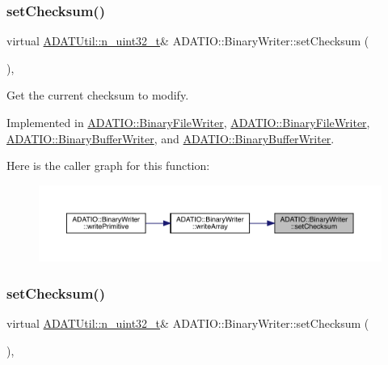 \subsubsection{\texorpdfstring{setChecksum()}{setChecksum()}\hspace{0.1cm}{\footnotesize\ttfamily [1/2]}}
{\footnotesize\ttfamily virtual \mbox{\hyperlink{namespaceADATUtil_ad945a8afa4db2d1f89b731964adae97e}{A\+D\+A\+T\+Util\+::n\+\_\+uint32\+\_\+t}}\& A\+D\+A\+T\+I\+O\+::\+Binary\+Writer\+::set\+Checksum (\begin{DoxyParamCaption}{ }\end{DoxyParamCaption})\hspace{0.3cm}{\ttfamily [protected]}, {}}



Get the current checksum to modify. 



Implemented in \mbox{\hyperlink{classADATIO_1_1BinaryFileWriter_a0137ec5926d08e49ed7a63c6ef33e882}{A\+D\+A\+T\+I\+O\+::\+Binary\+File\+Writer}}, \mbox{\hyperlink{classADATIO_1_1BinaryFileWriter_a0137ec5926d08e49ed7a63c6ef33e882}{A\+D\+A\+T\+I\+O\+::\+Binary\+File\+Writer}}, \mbox{\hyperlink{classADATIO_1_1BinaryBufferWriter_af4cc523a862ce29a96f1a813f254360e}{A\+D\+A\+T\+I\+O\+::\+Binary\+Buffer\+Writer}}, and \mbox{\hyperlink{classADATIO_1_1BinaryBufferWriter_af4cc523a862ce29a96f1a813f254360e}{A\+D\+A\+T\+I\+O\+::\+Binary\+Buffer\+Writer}}.

Here is the caller graph for this function\+:\nopagebreak
\begin{figure}[H]
\begin{center}
\leavevmode
\includegraphics[width=350pt]{db/dee/classADATIO_1_1BinaryWriter_ae64230370824192d1f0dbcaa8e74017a_icgraph}
\end{center}
\end{figure}
\mbox{\label{classADATIO_1_1BinaryWriter_ae64230370824192d1f0dbcaa8e74017a}} 
\subsubsection{\texorpdfstring{setChecksum()}{setChecksum()}\hspace{0.1cm}{\footnotesize\ttfamily [2/2]}}
{\footnotesize\ttfamily virtual \mbox{\hyperlink{namespaceADATUtil_ad945a8afa4db2d1f89b731964adae97e}{A\+D\+A\+T\+Util\+::n\+\_\+uint32\+\_\+t}}\& A\+D\+A\+T\+I\+O\+::\+Binary\+Writer\+::set\+Checksum (\begin{DoxyParamCaption}{ }\end{DoxyParamCaption})\hspace{0.3cm}{\ttfamily [protected]}, {}}



